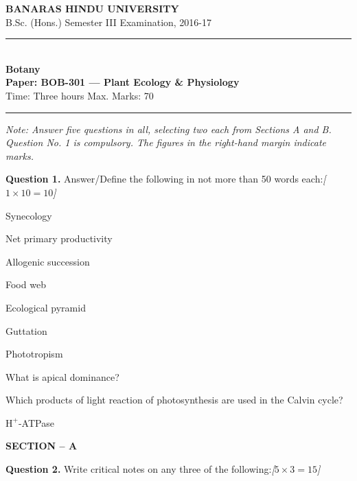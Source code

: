 \documentclass[11pt,a4paper]{article}
\newcommand{\pts}[1]{\hfill   \textit{[#1]}}
\begin{document}
\begin{center}
  {\large\bfseries BANARAS HINDU UNIVERSITY}\\[2pt]
  {\normalsize B.Sc. (Hons.) Semester III Examination, 2016-17}\\[6pt]
  \rule{0.8\linewidth}{0.5pt}\\[6pt]
  {\large\bfseries Botany}\\[4pt]
  {\large\bfseries Paper: BOB-301 --- Plant Ecology \& Physiology}\\[4pt]
  {\normalsize Time: Three hours \hfill Max. Marks: 70}
\end{center}

\rule{\linewidth}{0.4pt}

\smallskip



\noindent   \textit{Note: Answer five questions in all, selecting two each from Sections A and B. Question No. 1 is compulsory. The figures in the right-hand margin indicate marks.}

\bigskip

\medskip


\noindent   \textbf{Question 1.} Answer/Define the following in not more than 50 words each:\pts{$1  \times 10 = 10$}

\begin{parts}
  \item Synecology
  \item Net primary productivity
  \item Allogenic succession
  \item Food web
  \item Ecological pyramid
  \item Guttation
  \item Phototropism
  \item What is apical dominance?
  \item Which products of light reaction of photosynthesis are used in the Calvin cycle?
  \item $ \text{H}^+$-ATPase
\end{parts}

\bigskip

\begin{center}
   \textbf{SECTION -- A}
\end{center}

\medskip


\noindent   \textbf{Question 2.} Write critical notes on any three of the following:\pts{$5  \times 3 = 15$}
\end{document}
